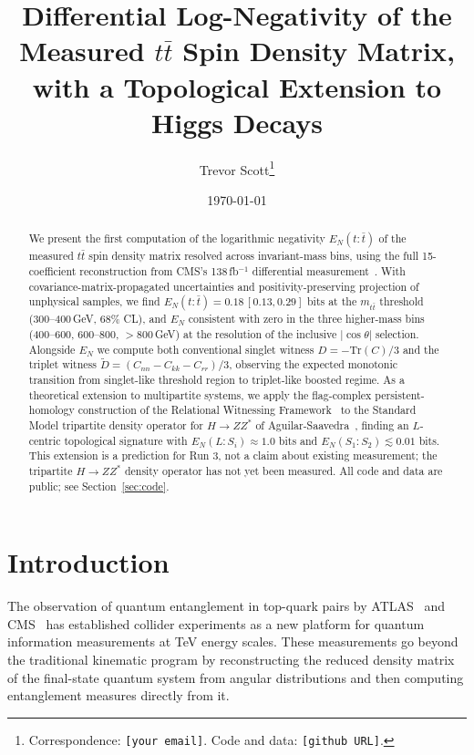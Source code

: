 \documentclass[11pt,a4paper]{article}
\title{Differential Log-Negativity of the Measured \texorpdfstring{$t\bar{t}$}{ttbar} Spin Density Matrix, with a Topological Extension to Higgs Decays}
\author{Trevor Scott\thanks{Correspondence: \texttt{[your email]}. Code and data: \texttt{[github URL]}.}}
\date{\today}
\theoremstyle{definition}
\begin{document}
\maketitle

\begin{abstract}
We present the first computation of the logarithmic negativity $E_N(t{:}\bar{t})$ of the measured $t\bar{t}$ spin density matrix resolved across invariant-mass bins, using the full 15-coefficient reconstruction from CMS's 138\,fb$^{-1}$ differential measurement~\cite{CMS2024}. With covariance-matrix-propagated uncertainties and positivity-preserving projection of unphysical samples, we find $E_N(t{:}\bar{t}) = 0.18\,[0.13, 0.29]$ bits at the $m_{t\bar{t}}$ threshold (300--400\,GeV, 68\% CL), and $E_N$ consistent with zero in the three higher-mass bins (400--600, 600--800, $>$800\,GeV) at the resolution of the inclusive $|\cos\theta|$ selection. Alongside $E_N$ we compute both conventional singlet witness $D = -\text{Tr}(C)/3$ and the triplet witness $\tilde{D} = (C_{nn} - C_{kk} - C_{rr})/3$, observing the expected monotonic transition from singlet-like threshold region to triplet-like boosted regime. As a theoretical extension to multipartite systems, we apply the flag-complex persistent-homology construction of the Relational Witnessing Framework~\cite{Scott2026RWF} to the Standard Model tripartite density operator for $H \to ZZ^*$ of Aguilar-Saavedra~\cite{AS2024}, finding an $L$-centric topological signature with $E_N(L{:}S_i) \approx 1.0$ bits and $E_N(S_1{:}S_2) \lesssim 0.01$ bits. This extension is a prediction for Run 3, not a claim about existing measurement; the tripartite $H \to ZZ^*$ density operator has not yet been measured. All code and data are public; see Section~\ref{sec:code}.
\end{abstract}

\section{Introduction}

The observation of quantum entanglement in top-quark pairs by ATLAS~\cite{ATLAS2024} and CMS~\cite{CMS2024, CMS2024entangle} has established collider experiments as a new platform for quantum information measurements at TeV energy scales. These measurements go beyond the traditional kinematic program by reconstructing the reduced density matrix of the final-state quantum system from angular distributions and then computing entanglement measures directly from it.
\end{document}
